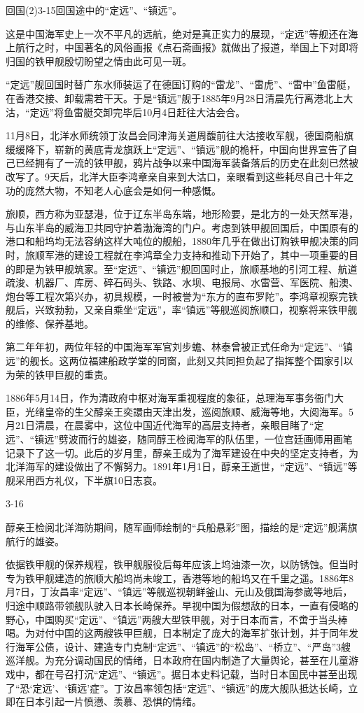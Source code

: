 \documentclass[12pt,UTF8]{ctexbook}
\begin{document}
回国(2)3-15回国途中的“定远”、“镇远”。

这是中国海军史上一次不平凡的远航，绝对是真正实力的展现，“定远”等舰还在海上航行之时，中国著名的风俗画报《点石斋画报》就做出了报道，举国上下对即将归国的铁甲舰殷切盼望之情由此可见一斑。

“定远”舰回国时替广东水师装运了在德国订购的“雷龙”、“雷虎”、“雷中”鱼雷艇，在香港交接、卸载需若干天。于是“镇远”舰于1885年9月28日清晨先行离港北上大沽，“定远”将鱼雷艇交卸完毕后10月4日赶往大沽会合。

11月8日，北洋水师统领丁汝昌会同津海关道周馥前往大沽接收军舰，德国商船旗缓缓降下，崭新的黄底青龙旗跃上“定远”、“镇远”舰的桅杆，中国向世界宣告了自己已经拥有了一流的铁甲舰，鸦片战争以来中国海军装备落后的历史在此刻已然被改写了。9天后，北洋大臣李鸿章亲自来到大沽口，亲眼看到这些耗尽自己十年之功的庞然大物，不知老人心底会是如何一种感慨。

旅顺，西方称为亚瑟港，位于辽东半岛东端，地形险要，是北方的一处天然军港，与山东半岛的威海卫共同守护着渤海湾的门户。考虑到铁甲舰回国后，中国原有的港口和船坞均无法容纳这样大吨位的舰船，1880年几乎在做出订购铁甲舰决策的同时，旅顺军港的建设工程就在李鸿章全力支持和推动下开始了，其中一项重要的目的即是为铁甲舰筑家。至“定远”、“镇远”舰回国时止，旅顺基地的引河工程、航道疏浚、机器厂、库房、碎石码头、铁路、水坝、电报局、水雷营、军医院、船澳、炮台等工程次第兴办，初具规模，一时被誉为“东方的直布罗陀”。李鸿章视察完铁舰后，兴致勃勃，又亲自乘坐“定远”，率“镇远”等舰巡阅旅顺口，视察将来铁甲舰的维修、保养基地。

第二年年初，两位年轻的中国海军军官刘步蟾、林泰曾被正式任命为“定远”、“镇远”的舰长。这两位福建船政学堂的同窗，此刻又共同担负起了指挥整个国家引以为荣的铁甲巨舰的重责。

1886年5月14日，作为清政府中枢对海军重视程度的象征，总理海军事务衙门大臣，光绪皇帝的生父醇亲王奕譞由天津出发，巡阅旅顺、威海等地，大阅海军。5月21日清晨，在晨雾中，这位中国近代海军的高层支持者，亲眼目睹了“定远”、“镇远”劈波而行的雄姿，随同醇王检阅海军的队伍里，一位宫廷画师用画笔记录下了这一切。此后的岁月里，醇亲王成为了海军建设在中央的坚定支持者，为北洋海军的建设做出了不懈努力。1891年1月1日，醇亲王逝世，“定远”、“镇远”等舰采用西方礼仪，下半旗10日志哀。

3-16

醇亲王检阅北洋海防期间，随军画师绘制的“兵船悬彩”图，描绘的是“定远”舰满旗航行的雄姿。

依据铁甲舰的保养规程，铁甲舰服役后每年应该上坞油漆一次，以防锈蚀。但当时专为铁甲舰建造的旅顺大船坞尚未竣工，香港等地的船坞又在千里之遥。1886年8月7日，丁汝昌率“定远”、“镇远”等舰巡视朝鲜釜山、元山及俄国海参崴等地后，归途中顺路带领舰队驶入日本长崎保养。早视中国为假想敌的日本，一直有侵略的野心，中国购买“定远”、“镇远”两艘大型铁甲舰，对于日本而言，不啻于当头棒喝。为对付中国的这两艘铁甲巨舰，日本制定了庞大的海军扩张计划，并于同年发行海军公债，设计、建造专门克制“定远”、“镇远”的“松岛”、“桥立”、“严岛”3艘巡洋舰。为充分调动国民的情绪，日本政府在国内制造了大量舆论，甚至在儿童游戏中，都在号召打沉“定远”、“镇远”。据日本史料记载，当时日本国民中甚至出现了“恐‘定远’、‘镇远’症”。丁汝昌率领包括“定远”、“镇远”的庞大舰队抵达长崎，立即在日本引起一片愤懑、羡慕、恐惧的情绪。
\end{document}
